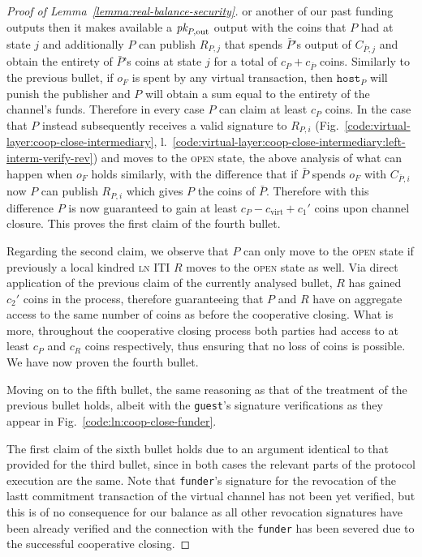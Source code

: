 \begin{proof}[Proof of Lemma~\ref{lemma:real-balance-security}]
  or another of our past funding outputs then it makes available a $\textit{pk}_{P,
  \mathrm{out}}$ output with the coins that $P$ had at state $j$ and
  additionally $P$ can publish $R_{P, j}$ that spends $\bar{P}$'s output of
  $C_{\bar{P}, j}$ and obtain the entirety of $\bar{P}$'s coins at state $j$ for
  a total of $c_P + c_{\bar{P}}$ coins. Similarly to the previous bullet, if
  $o_F$ is spent by any virtual transaction, then $\texttt{host}_P$ will punish
  the publisher and $P$ will obtain a sum equal to the entirety of the channel's
  funds. Therefore in every case $P$ can claim at least $c_P$ coins. In the case
  that $P$ instead subsequently receives a valid signature to $R_{P, i}$
  (Fig.~\ref{code:virtual-layer:coop-close-intermediary},
  l.~\ref{code:virtual-layer:coop-close-intermediary:left-interm-verify-rev})
  and moves to the \textsc{open} state, the above analysis of what can happen
  when $o_F$ holds similarly, with the difference that if $\bar{P}$ spends $o_F$
  with $C_{\bar{P}, i}$ now $P$ can publish $R_{P, i}$ which gives $P$ the coins
  of $\bar{P}$. Therefore with this difference $P$ is now guaranteed to gain at
  least $c_P - c_{\mathrm{virt}} + c_1'$ coins upon channel closure. This proves
  the first claim of the fourth bullet.

  Regarding the second claim, we observe that $P$ can only move to the
  \textsc{open} state if previously a local kindred \textsc{ln} ITI $R$ moves to
  the \textsc{open} state as well. Via direct application of the previous claim
  of the currently analysed bullet, $R$ has gained $c_2'$ coins in the process,
  therefore guaranteeing that $P$ and $R$ have on aggregate access to the same
  number of coins as before the cooperative closing. What is more, throughout
  the cooperative closing process both parties had access to at least $c_P$ and
  $c_R$ coins respectively, thus ensuring that no loss of coins is possible. We
  have now proven the fourth bullet.

  Moving on to the fifth bullet, the same reasoning as that of the treatment of
  the previous bullet holds, albeit with the \texttt{guest}'s signature
  verifications as they appear in Fig.~\ref{code:ln:coop-close-funder}.

  The first claim of the sixth bullet holds due to an argument identical to that
  provided for the third bullet, since in both cases the relevant parts of the
  protocol execution are the same. Note that \texttt{funder}'s signature for the
  revocation of the lastt commitment transaction of the virtual channel has not
  been yet verified, but this is of no consequence for our balance as all other
  revocation signatures have been already verified and the connection with the
  \texttt{funder} has been severed due to the successful cooperative closing.


\end{proof}
